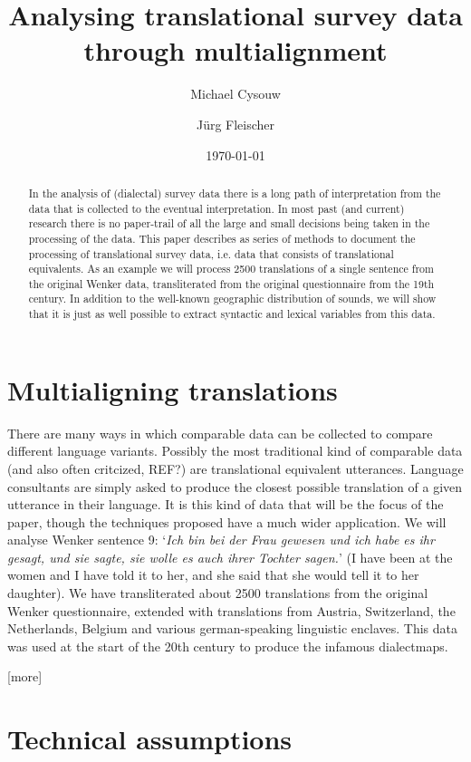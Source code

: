 \documentclass[11pt]{article}
\title{Analysing translational survey data through multialignment}
\author{Michael Cysouw \and Jürg Fleischer}
\date{\today}
\begin{document}
  
\maketitle
  
\begin{abstract}
In the analysis of (dialectal) survey data there is a long path of interpretation from the data that is collected to the eventual interpretation. In most past (and current) research there is no paper-trail of all the large and small decisions being taken in the processing of the data. This paper describes as series of methods to document the processing of translational survey data, i.e. data that consists of translational equivalents. As an example we will process 2500 translations of a single sentence from the original Wenker data, transliterated from the original questionnaire from the 19th century. In addition to the well-known geographic distribution of sounds, we will show that it is just as well possible to extract syntactic and lexical variables from this data.
\end{abstract}

\section{Multialigning translations}

There are many ways in which comparable data can be collected to compare different language variants. Possibly the most traditional kind of comparable data (and also often critcized, REF?) are translational equivalent utterances. Language consultants are simply asked to produce the closest possible translation of a given utterance in their language. It is this kind of data that will be the focus of the paper, though the techniques proposed have a much wider application. We will analyse Wenker sentence 9: `\textit{Ich bin bei der Frau gewesen und ich habe es ihr gesagt, und sie sagte, sie wolle es auch ihrer Tochter sagen.}' (I have been at the women and I have told it to her, and she said that she would tell it to her daughter). We have transliterated about 2500 translations from the original Wenker questionnaire, extended with translations from Austria, Switzerland, the Netherlands, Belgium and various german-speaking linguistic enclaves. This data was used at the start of the 20th century to produce the infamous dialectmaps.

[more]

\section{Technical assumptions}
\end{document}
